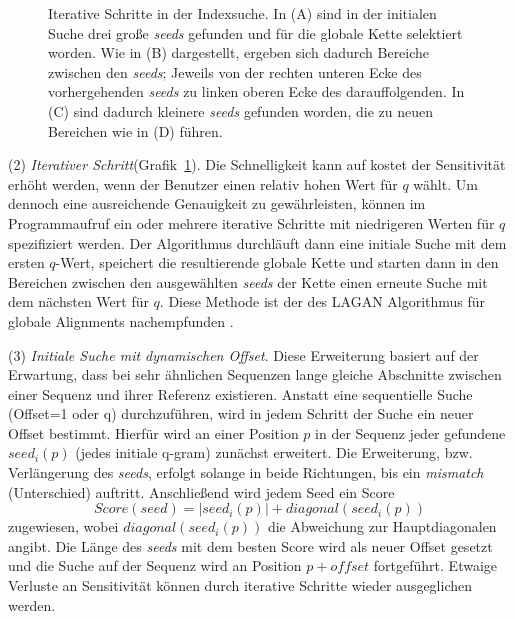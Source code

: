\documentclass[12pt]{article}
\begin{document}
\begin{figure}[b]
\label{fig:iterativ}
\caption{Iterative Schritte in der Indexsuche. In (A) sind in der initialen Suche drei große \textit{seeds} gefunden und für die globale Kette selektiert worden. Wie in (B) dargestellt, ergeben sich dadurch Bereiche zwischen den \textit{seeds}; Jeweils von der rechten unteren Ecke des vorhergehenden \textit{seeds} zu linken oberen Ecke des darauffolgenden. In (C) sind dadurch kleinere \textit{seeds} gefunden worden, die zu neuen Bereichen wie in (D) führen.}
\end{figure}

(2) \emph{Iterativer Schritt}(Grafik~\ref{fig:iterativ}). Die Schnelligkeit kann auf kostet der Sensitivität erhöht werden, wenn der Benutzer einen relativ hohen Wert für $q$ wählt. Um dennoch eine ausreichende Genauigkeit zu gewährleisten, können im Programmaufruf ein oder mehrere iterative Schritte mit niedrigeren Werten für $q$ spezifiziert werden. Der Algorithmus durchläuft dann eine initiale Suche mit dem ersten $q$-Wert, speichert die resultierende globale Kette und starten dann in den Bereichen zwischen den ausgewählten \textit{seeds} der Kette einen erneute Suche mit dem nächsten Wert für $q$. Diese Methode ist der des LAGAN Algorithmus für globale Alignments nachempfunden \cite{brudno03lagan}.

(3) \emph{Initiale Suche mit dynamischen Offset}. Diese Erweiterung basiert auf der Erwartung, dass bei sehr ähnlichen Sequenzen lange gleiche Abschnitte zwischen einer Sequenz und ihrer Referenz existieren. Anstatt eine sequentielle Suche (Offset=1 oder q) durchzuführen, wird in jedem Schritt der Suche ein neuer Offset bestimmt.  Hierfür wird an einer Position $p$ in der Sequenz jeder gefundene $seed_{i}(p)$ (jedes initiale q-gram) zunächst erweitert. Die Erweiterung, bzw. Verlängerung des \textit{seeds}, erfolgt solange in beide Richtungen, bis ein \textit{mismatch} (Unterschied) auftritt. Anschließend wird jedem Seed ein Score 
\begin{equation}
Score(seed)=|seed_{i}(p)|+diagonal(seed_{i}(p))
\end{equation}
zugewiesen, wobei $diagonal(seed_{i}(p))$ die Abweichung zur Hauptdiagonalen angibt. Die Länge des \textit{seeds} mit dem besten 
Score wird als neuer Offset gesetzt und die Suche auf der Sequenz wird an Position $p+offset$ fortgeführt. Etwaige Verluste an Sensitivität können durch iterative Schritte wieder ausgeglichen werden.
\end{document}
